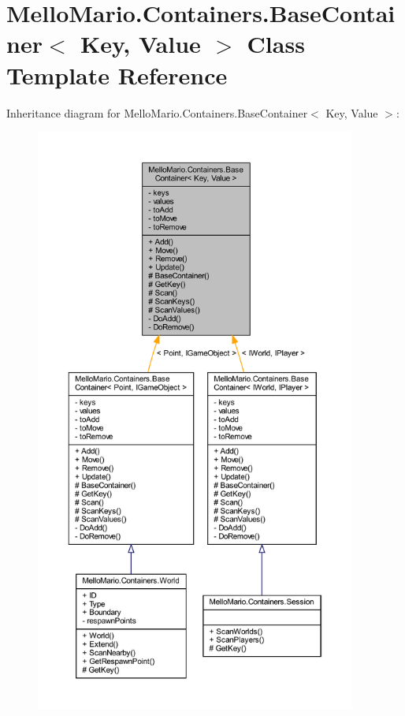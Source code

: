 \section{Mello\+Mario.\+Containers.\+Base\+Container$<$ Key, Value $>$ Class Template Reference}
\label{classMelloMario_1_1Containers_1_1BaseContainer}


Inheritance diagram for Mello\+Mario.\+Containers.\+Base\+Container$<$ Key, Value $>$\+:
\nopagebreak
\begin{figure}[H]
\begin{center}
\leavevmode
\includegraphics[height=550pt]{classMelloMario_1_1Containers_1_1BaseContainer__inherit__graph}
\end{center}
\end{figure}


